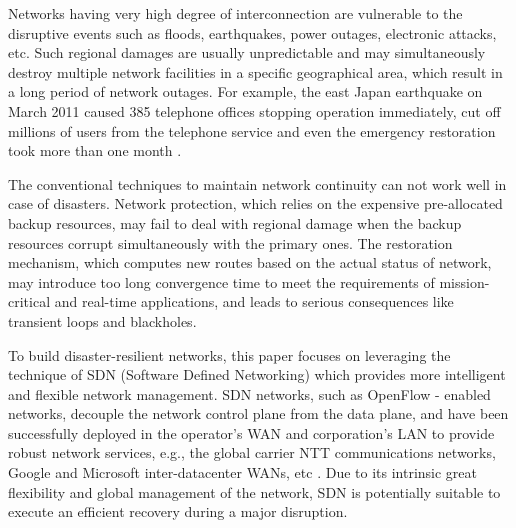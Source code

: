 \documentclass[10pt,journal]{IEEEtran}
\begin{document}
Networks having very high degree of interconnection are vulnerable to the disruptive events such as floods, earthquakes, power outages, electronic attacks, etc. Such regional damages are usually unpredictable and may simultaneously destroy multiple network facilities in a specific geographical area, which result in a long period of network outages. For example, the east Japan earthquake on March 2011 caused 385 telephone offices stopping operation immediately, cut off millions of users from the telephone service and even the emergency restoration took more than one month \cite{sakano2013disaster}.



The conventional techniques to maintain network continuity can not work well in case of disasters. Network protection, which relies on the expensive pre-allocated backup resources, may fail to deal with regional damage when the backup resources corrupt simultaneously with the primary ones. The restoration mechanism, which computes new routes based on the actual status of network, may introduce too long convergence time to meet the requirements of mission-critical and real-time applications, and leads to serious consequences like transient loops and blackholes\cite{kompella2007detection}.

To build disaster-resilient networks, this paper focuses on leveraging the technique of SDN (Software Defined Networking) which provides more intelligent and flexible network management.
SDN networks, such as OpenFlow - enabled \cite{mckeown2008openflow} networks, decouple the network control plane from the data plane, and have been successfully deployed in the operator's WAN and corporation's LAN to provide robust network services, e.g., the global carrier NTT communications networks, Google and Microsoft inter-datacenter WANs, etc \cite{jain2013b4,hong2013achieving}. Due to its intrinsic great flexibility and global management of the network, SDN is potentially suitable to execute an efficient recovery during a major disruption.
\end{document}
